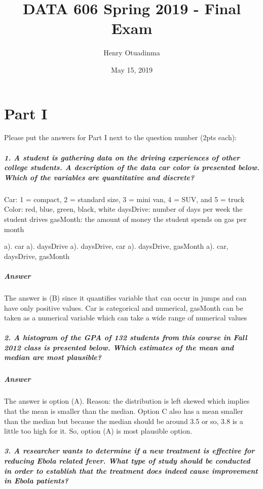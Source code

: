 \documentclass[]{article}
\title{DATA 606 Spring 2019 - Final Exam}
\author{Henry Otuadinma}
\date{May 15, 2019}
\let\oldsubparagraph\subparagraph
\renewcommand{\subparagraph}[1]{\oldsubparagraph{#1}\mbox{}}
\begin{document}
\maketitle

\section{Part I}\label{part-i}

Please put the answers for Part I next to the question number (2pts
each):

\subparagraph{1. A student is gathering data on the driving experiences
of other college students. A description of the data car color is
presented below. Which of the variables are quantitative and
discrete?}\label{a-student-is-gathering-data-on-the-driving-experiences-of-other-college-students.-a-description-of-the-data-car-color-is-presented-below.-which-of-the-variables-are-quantitative-and-discrete}

Car: 1 = compact, 2 = standard size, 3 = mini van, 4 = SUV, and 5 =
truck Color: red, blue, green, black, white daysDrive: number of days
per week the student drives gasMonth: the amount of money the student
spends on gas per month

a). car a). daysDrive a). daysDrive, car a). daysDrive, gasMonth a).
car, daysDrive, gasMonth

\subparagraph{Answer}\label{answer}

The answer is (B) since it quantifies variable that can occur in jumps
and can have only positive values. Car is categorical and numerical,
gasMonth can be taken as a numerical variable which can take a wide
range of numerical values

\subparagraph{2. A histogram of the GPA of 132 students from this course
in Fall 2012 class is presented below. Which estimates of the mean and
median are most
plausible?}\label{a-histogram-of-the-gpa-of-132-students-from-this-course-in-fall-2012-class-is-presented-below.-which-estimates-of-the-mean-and-median-are-most-plausible}

\subparagraph{Answer}\label{answer-1}

The answer is option (A). Reason: the distribution is left skewed which
implies that the mean is smaller than the median. Option C also has a
mean smaller than the median but because the median should be around 3.5
or so, 3.8 is a little too high for it. So, option (A) is most plausible
option.

\subparagraph{3. A researcher wants to determine if a new treatment is
effective for reducing Ebola related fever. What type of study should be
conducted in order to establish that the treatment does indeed cause
improvement in Ebola
patients?}\label{a-researcher-wants-to-determine-if-a-new-treatment-is-effective-for-reducing-ebola-related-fever.-what-type-of-study-should-be-conducted-in-order-to-establish-that-the-treatment-does-indeed-cause-improvement-in-ebola-patients}
\end{document}
